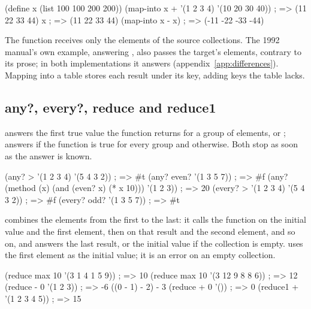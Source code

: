 \begin{dylan}
(define x (list 100 100 200 200))
(map-into x + '(1 2 3 4) '(10 20 30 40))   ; => (11 22 33 44)
x                                          ; => (11 22 33 44)
(map-into x - x)                           ; => (-11 -22 -33 -44)
\end{dylan}

\noindent The function receives only the elements of the source
collections. The 1992 manual's own example,
 answering ,
also passes the target's elements, contrary to its prose; in both
implementations it answers  (appendix~\ref{app:differences}).
Mapping into a table stores each result under its key, adding keys the
table lacks.

\subsection{any?, every?, reduce and reduce1}

 answers the first true value the function returns for a
group of elements, or ;  answers  if the
function is true for every group and  otherwise. Both stop as
soon as the answer is known.

\begin{dylan}
(any? > '(1 2 3 4) '(5 4 3 2))       ; => #t
(any? even? '(1 3 5 7))              ; => #f
(any? (method (x) (and (even? x) (* x 10))) '(1 2 3))   ; => 20
(every? > '(1 2 3 4) '(5 4 3 2))     ; => #f
(every? odd? '(1 3 5 7))             ; => #t
\end{dylan}

combines the elements from the first to the last: it calls the function
on the initial value and the first element, then on that result and the
second element, and so on, and answers the last result, or the initial
value if the collection is empty.  uses the first element
as the initial value; it is an error on an empty collection.

\begin{dylan}
(reduce max 10 '(3 1 4 1 5 9))    ; => 10
(reduce max 10 '(3 12 9 8 8 6))   ; => 12
(reduce - 0 '(1 2 3))             ; => -6      ((0 - 1) - 2) - 3
(reduce + 0 '())                  ; => 0
(reduce1 + '(1 2 3 4 5))          ; => 15
\end{dylan}

